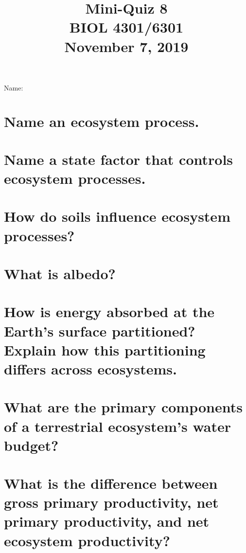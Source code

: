 \documentclass[12pt, notitlepage]{article}   	%
\title{
	\textbf{
		Mini-Quiz 8
	} \\
	\large BIOL 4301/6301 \\
	\large November 7, 2019 \\
}
\date{\vspace{-5ex}}
\def\wl{\par \vspace{\baselineskip}}
\begin{document}
{\selectfont %

\large{Name:}

{\let\newpage\relax\maketitle}

\section{\small{Name an ecosystem process.}}

\wl
\wl
\wl
\wl

\section{\small{Name a state factor that controls ecosystem processes.}}

\wl
\wl
\wl
\wl

\section{\small{How do soils influence ecosystem processes?}}

\newpage

\section{\small{What is albedo?}}

\wl
\wl
\wl
\wl

\section{\small{How is energy absorbed at the Earth's surface partitioned?
Explain how this partitioning differs across ecosystems.}}

\wl
\wl
\wl
\wl
\wl
\wl
\wl
\wl
\wl
\wl
\wl
\wl

\section{\small{What are the primary components of a terrestrial ecosystem's water budget?}}

\newpage

\section{\small{What is the difference between gross primary productivity, net primary productivity,
and net ecosystem productivity?}}

}
\end{document}
